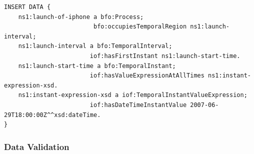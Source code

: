 \begin{verbatim}
INSERT DATA {
    ns1:launch-of-iphone a bfo:Process;
                         bfo:occupiesTemporalRegion ns1:launch-interval;
    ns1:launch-interval a bfo:TemporalInterval;
                        iof:hasFirstInstant ns1:launch-start-time.
    ns1:launch-start-time a bfo:TemporalInstant;
                        iof:hasValueExpressionAtAllTimes ns1:instant-expression-xsd.
    ns1:instant-expression-xsd a iof:TemporalInstantValueExpression; 
                        iof:hasDateTimeInstantValue 2007-06-29T18:00:00Z^^xsd:dateTime.
}
\end{verbatim}


\subsubsection*{Data Validation}


